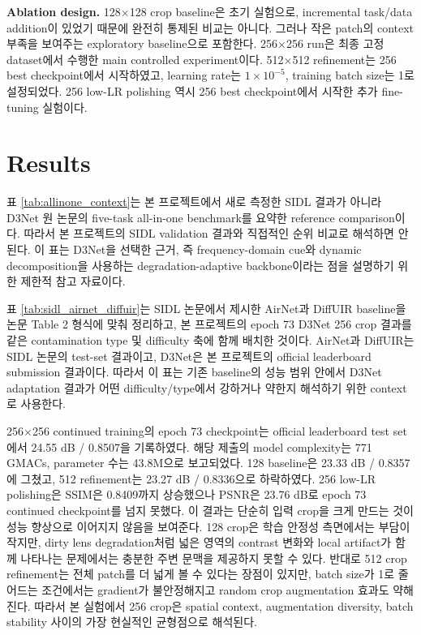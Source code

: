 \documentclass[10pt,a4paper]{article}
\begin{document}
\textbf{Ablation design.}
128$\times$128 crop baseline은 초기 실험으로, incremental task/data addition이 있었기 때문에 완전히 통제된 비교는 아니다.
그러나 작은 patch의 context 부족을 보여주는 exploratory baseline으로 포함한다.
256$\times$256 run은 최종 고정 dataset에서 수행한 main controlled experiment이다.
512$\times$512 refinement는 256 best checkpoint에서 시작하였고, learning rate는 $1\times10^{-5}$, training batch size는 1로 설정되었다.
256 low-LR polishing 역시 256 best checkpoint에서 시작한 추가 fine-tuning 실험이다.

\section{Results}


표 \ref{tab:allinone_context}는 본 프로젝트에서 새로 측정한 SIDL 결과가 아니라 D3Net 원 논문의 five-task all-in-one benchmark를 요약한 reference comparison이다.
따라서 본 프로젝트의 SIDL validation 결과와 직접적인 순위 비교로 해석하면 안 된다.
이 표는 D3Net을 선택한 근거, 즉 frequency-domain cue와 dynamic decomposition을 사용하는 degradation-adaptive backbone이라는 점을 설명하기 위한 제한적 참고 자료이다.



표 \ref{tab:sidl_airnet_diffuir}는 SIDL 논문에서 제시한 AirNet과 DiffUIR baseline을 논문 Table 2 형식에 맞춰 정리하고, 본 프로젝트의 epoch 73 D3Net 256 crop 결과를 같은 contamination type 및 difficulty 축에 함께 배치한 것이다.
AirNet과 DiffUIR는 SIDL 논문의 test-set 결과이고, D3Net은 본 프로젝트의 official leaderboard submission 결과이다.
따라서 이 표는 기존 baseline의 성능 범위 안에서 D3Net adaptation 결과가 어떤 difficulty/type에서 강하거나 약한지 해석하기 위한 context로 사용한다.



256$\times$256 continued training의 epoch 73 checkpoint는 official leaderboard test set에서 24.55 dB / 0.8507을 기록하였다.
해당 제출의 model complexity는 771 GMACs, parameter 수는 43.8M으로 보고되었다.
128 baseline은 23.33 dB / 0.8357에 그쳤고, 512 refinement는 23.27 dB / 0.8336으로 하락하였다.
256 low-LR polishing은 SSIM은 0.8409까지 상승했으나 PSNR은 23.76 dB로 epoch 73 continued checkpoint를 넘지 못했다.
이 결과는 단순히 입력 crop을 크게 만드는 것이 성능 향상으로 이어지지 않음을 보여준다.
128 crop은 학습 안정성 측면에서는 부담이 작지만, dirty lens degradation처럼 넓은 영역의 contrast 변화와 local artifact가 함께 나타나는 문제에서는 충분한 주변 문맥을 제공하지 못할 수 있다.
반대로 512 crop refinement는 전체 patch를 더 넓게 볼 수 있다는 장점이 있지만, batch size가 1로 줄어드는 조건에서는 gradient가 불안정해지고 random crop augmentation 효과도 약해진다.
따라서 본 실험에서 256 crop은 spatial context, augmentation diversity, batch stability 사이의 가장 현실적인 균형점으로 해석된다.
\end{document}

